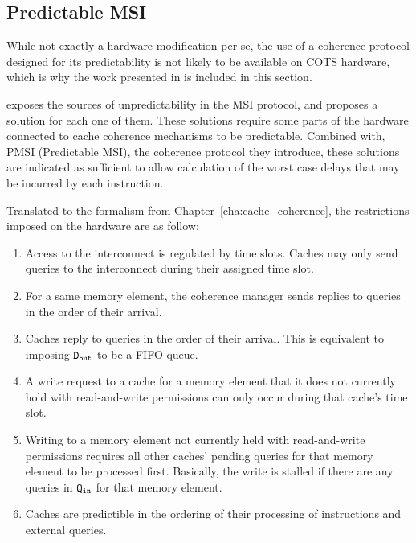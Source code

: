 \subsection{Predictable MSI}
\label{sec:related_works:pmsi}
While not exactly a hardware modification per se, the use of a coherence
protocol designed for its predictability is not likely to be available on COTS
hardware, which is why the work presented in \cite{conf/rtas/HassanKP17} is
included in this section.

\cite{conf/rtas/HassanKP17} exposes the sources of unpredictability in the MSI
protocol, and proposes a solution for each one of them. These solutions require
some parts of the hardware connected to cache coherence mechanisms to be
predictable. Combined with, PMSI (Predictable MSI), the coherence protocol they
introduce, these solutions are indicated as sufficient to allow calculation of
the worst case delays that may be incurred by each instruction.

Translated to the formalism from Chapter~\ref{cha:cache_coherence}, the
restrictions imposed on the hardware are as follow:
\begin{enumerate}
\item
   Access to the interconnect is regulated by time slots. Caches may only send
   queries to the interconnect during their assigned time slot.
   \label{enum:pmsi_time_slot}
\item
   For a same memory element, the coherence manager sends replies to queries in
   the order of their arrival.
\item
   Caches reply to queries in the order of their arrival. This is equivalent
   to imposing $\text{\texttt{D\textsubscript{out}}}{}$ to be a FIFO queue.
\item
   A write request to a cache for a memory element that it does not currently
   hold with read-and-write permissions can only occur during that cache's
   time slot.
   \label{enum:pmsi_write_time}
\item
   Writing to a memory element not currently held with read-and-write
   permissions requires all other caches' pending queries for that memory
   element to be processed first. Basically, the write is stalled if there
   are any queries in $\text{\texttt{Q\textsubscript{in}}}{}$ for that memory element.
   \label{enum:pmsi_ordering}
\item
   Caches are predictible in the ordering of their processing of instructions
   and external queries.
\end{enumerate}

